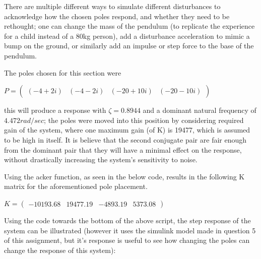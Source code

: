\documentclass[12pt]{article}
\begin{document}
\vspace{\baselineskip}


There are multiple different ways to simulate different disturbances to acknowledge how the chosen poles respond, and whether they need to be rethought; one can change the mass of the pendulum (to replicate the experience for a child instead of a 80kg person), add a disturbance acceleration to mimic a bump on the ground, or similarly add an impulse or step force to the base of the pendulum. 

The poles chosen for this section were


\vspace{\baselineskip}


$P = \left(\begin{array}{cccc} (-4+2i) & (-4-2i) & (-20+10i) & (-20-10i) \end{array}
\right)$


\vspace{\baselineskip}


this will produce a response with $\zeta = 0.8944$ and a dominant natural frequency of $4.472 rad/sec$; the poles were moved into this position by considering required gain of the system, where one maximum gain (of K) is 19477, which is assumed to be high in itself. It is believe that the second conjugate pair are fair enough from the dominant pair that they will have a minimal effect on the response, without drastically increasing the system's sensitivity to noise.


\vspace{\baselineskip}


Using the acker function, as seen in the below code, results in the following K matrix for the aforementioned pole placement.


\vspace{\baselineskip}


$K = \left(\begin{array}{cccc} -10193.68 & 19477.19 & -4893.19 & 5373.08 \end{array}\right)$


\vspace{\baselineskip}



\vspace{\baselineskip}


Using the code towards the bottom of the above script, the step response of the system can be illustrated (however it uses the simulink model made in question 5 of this assignment, but it's response is useful to see how changing the poles can change the response of this system):
\vspace{\baselineskip}
\end{document}
